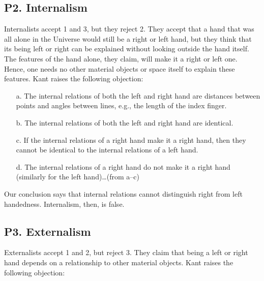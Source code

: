 \documentclass[oneside]{article}
\begin{document}
\subsection*{P2. Internalism}\label{p2.-internalism}

Internalists accept 1 and 3, but they reject 2. They accept that a hand
that was all alone in the Universe would still be a right or left hand,
but they think that its being left or right can be explained without
looking outside the hand itself. The features of the hand alone, they
claim, will make it a right or left one. Hence, one needs no other
material objects or space itself to explain these features. Kant raises the following objection:

\begin{enumerate}

\item[a.]
  The internal relations of both the left and right hand are distances
  between points and angles between lines, e.g., the length of the index
  finger.
\item[b.]
  The internal relations of both the left and right hand are identical.
\item[c.]
  If the internal relations of a right hand make it a right hand, then
  they cannot be identical to the internal relations of a left hand.
\item[d.]
  The internal relations of a right hand do not make it a right hand
  (similarly for the left hand)\ldots{}(from a--c)
\end{enumerate}
Our conclusion says that internal relations cannot distinguish right
from left handedness. Internalism, then, is false. 

\subsection*{P3. Externalism}\label{p3.-externalism}

Externalists accept 1 and 2, but reject 3. They claim that being a left
or right hand depends on a relationship to other material objects. Kant raises the following objection:
\end{document}
